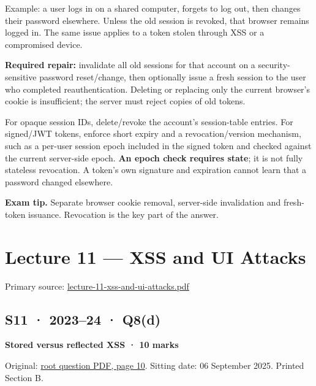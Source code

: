 \documentclass[11pt,a4paper]{article}
\begin{document}
Example: a user logs in on a shared computer,\allowbreak{} forgets to log out,\allowbreak{} then changes their password elsewhere. Unless the old session is revoked,\allowbreak{} that browser remains logged in. The same issue applies to a token stolen through XSS or a compromised device.


\textbf{Required repair:} invalidate all old sessions for that account on a security-sensitive password reset/\allowbreak{}change,\allowbreak{} then optionally issue a fresh session to the user who completed reauthentication. Deleting or replacing only the current browser’s cookie is insufficient; the server must reject copies of old tokens.


For opaque session IDs,\allowbreak{} delete/\allowbreak{}revoke the account’s session-table entries. For signed/\allowbreak{}JWT tokens,\allowbreak{} enforce short expiry and a revocation/\allowbreak{}version mechanism,\allowbreak{} such as a per-user session epoch included in the signed token and checked against the current server-side epoch. \textbf{An epoch check requires state}; it is not fully stateless revocation. A token’s own signature and expiration cannot learn that a password changed elsewhere.



{\color{ForestGreen}\textbf{Exam tip.} Separate browser cookie removal,\allowbreak{} server-side invalidation and fresh-token issuance. Revocation is the key part of the answer.}



\clearpage
\section{Lecture 11 — XSS and UI Attacks}

Primary source: \href{../slides/lecture-11-xss-and-ui-attacks.pdf}{lecture-11-xss-and-ui-attacks.\allowbreak{}pdf}




\subsection{S11 · 2023–24 · Q8(d)}\label{s11}

\textbf{Stored versus reflected XSS · 10 marks}


Original: \href{../../CSE405-Security_Merged.pdf\#page=10}{root question PDF,\allowbreak{} page 10}. Sitting date: 06 September 2025. Printed Section B.
\end{document}
